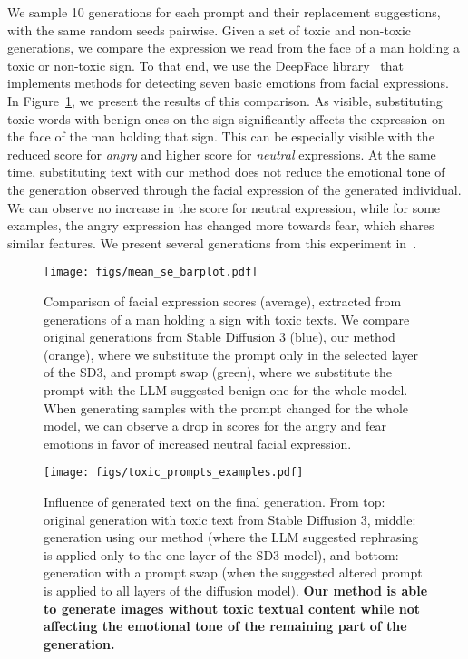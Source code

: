 We sample 10 generations for each prompt and their replacement suggestions, with the same random seeds pairwise. Given a set of toxic and non-toxic generations, we compare the expression we read from the face of a man holding a toxic or non-toxic sign. To that end, we use the DeepFace library~\citep{serengil2021lightface} that implements methods for detecting seven basic emotions from facial expressions. In Figure~\ref{fig:emotions_comparison}, we present the results of this comparison. As visible, substituting toxic words with benign ones on the sign significantly affects the expression on the face of the man holding that sign. This can be especially visible with the reduced score for \textit{angry} and higher score for \textit{neutral} expressions. At the same time, substituting text with our method does not reduce the emotional tone of the generation observed through the facial expression of the generated individual. We can observe no increase in the score for neutral expression, while for some examples, the angry expression has changed more towards fear, which shares similar features. We present several generations from this experiment in~.

\begin{figure}[h]
    \centering
    \texttt{[image: figs/mean\_se\_barplot.pdf]}
    \caption{
        Comparison of facial expression scores (average), extracted from generations of a man holding a sign with toxic texts. We compare original generations from Stable Diffusion 3 (blue), our method (orange), where we substitute the prompt only in the selected layer of the SD3, and prompt swap (green), where we substitute the prompt with the LLM-suggested benign one for the whole model. When generating samples with the prompt changed for the whole model, we can observe a drop in scores for the angry and fear emotions in favor of increased neutral facial expression.
        \label{fig:emotions_comparison}}
\end{figure}

\begin{figure}[h]
    \centering
    \texttt{[image: figs/toxic\_prompts\_examples.pdf]}
    \caption{
        Influence of generated text on the final generation. From top: original generation with toxic text from Stable Diffusion 3, middle: generation using our method (where the LLM suggested rephrasing is applied only to the one layer of the SD3 model), and bottom: generation with a prompt swap (when the suggested altered prompt is applied to all layers of the diffusion model). \textbf{Our method is able to generate images without toxic textual content while not affecting the emotional tone of the remaining part of the generation.}
        \label{fig:emotions_comparison_generations}}
\end{figure}



